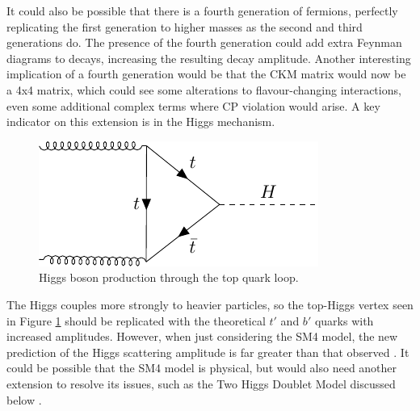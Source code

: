 \documentclass[a4paper,12pt]{article}
\begin{document}
It could also be possible that there is a fourth generation of fermions, perfectly replicating the first generation to higher masses as the second and third generations do. 
The presence of the fourth generation could add extra Feynman diagrams to decays, increasing the resulting decay amplitude. 
Another interesting implication of a fourth generation would be that the CKM matrix would now be a 4x4 matrix, which could see some alterations to flavour-changing interactions, even some additional complex terms where CP violation would arise. 
A key indicator on this extension is in the Higgs mechanism. 
\begin{figure}[H]
    \centering
    \includegraphics{../notes/higgs.pdf}
    \caption{\label{fig:higgs} Higgs boson production through the top quark loop.}
\end{figure}
The Higgs couples more strongly to heavier particles, so the top-Higgs vertex seen in Figure \ref{fig:higgs} should be replicated with the theoretical $t'$ and $b'$ quarks with increased amplitudes. 
However, when just considering the SM4 model, the new prediction of the Higgs scattering amplitude is far greater than that observed \cite{sm4}. 
It could be possible that the SM4 model is physical, but would also need another extension to resolve its issues, such as the Two Higgs Doublet Model discussed below \cite{shal}. 

%
\end{document}
